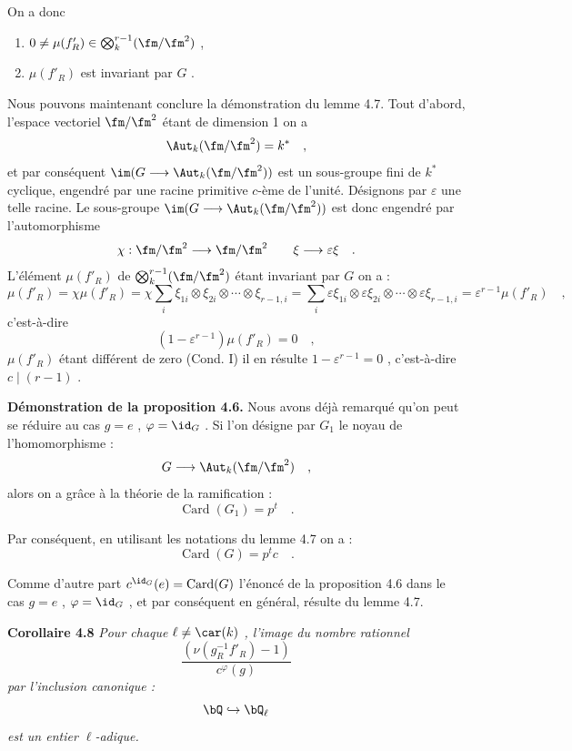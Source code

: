 On a donc
\begin{enumerate}
\item[1)] $0 \neq \mu(f'_R) \in \bigotimes_k^{r-1}(\fm/\fm^2)$ ,
\item[II)] $\mu(f'_R)$ est
invariant par $G$ .
\end{enumerate}

Nous pouvons maintenant conclure la démonstration du lemme 4.7. Tout d'abord, l'espace vectoriel $\fm/\fm^2$ étant de dimension 1 on a
\[
\Aut_k(\fm/\fm^2) = k^* \quad ,
\]
et par conséquent $\im(G \longrightarrow \Aut_k(\fm/\fm^2))$ est un sous-groupe fini de $k^*$ cyclique, engendré par une racine primitive $c$-ème de l'unité. Désignons par $\varepsilon$ une telle racine. Le sous-groupe $\im(G \longrightarrow \Aut_k(\fm/\fm^2))$ est donc engendré par l'automorphisme
\[
\chi : \fm/\fm^2 \longrightarrow \fm/\fm^2 \quad \quad \xi \longrightarrow \varepsilon\xi \quad .
\]
L'élément $\mu(f'_R)$ de $\bigotimes_k^{r-1}(\fm/\fm^2)$ étant invariant par $G$ on a :
\[
\mu(f'_R) = \chi\mu(f'_R) = \chi\sum_i \xi_{1i} \otimes \xi_{2i} \otimes \cdots \otimes \xi_{r-1,i} = \sum_i \varepsilon\xi_{1i} \otimes \varepsilon\xi_{2i} \otimes \cdots \otimes \varepsilon\xi_{r-1,i} = \varepsilon^{r-1}\mu(f'_R) \quad ,
\]
c'est-à-dire
\[
(1 - \varepsilon^{r-1})\mu(f'_R) = 0 \quad ,
\]
$\mu(f'_R)$ étant différent de zero (Cond. I) il en résulte $1 - \varepsilon^{r-1} = 0$ , c'est-à-dire $c \mid (r-1)$ .

\medskip

\noindent
\textbf{Démonstration de la proposition 4.6.} Nous avons déjà remarqué qu'on peut se réduire au cas $g = e$ , $\varphi = \id_G$ . Si l'on désigne par $G_1$ le noyau de l'homomorphisme :
\[
G \longrightarrow \Aut_k(\fm/\fm^2) \quad ,
\]
alors on a grâce à la théorie de la ramification :
\[
\operatorname{Card}(G_1) = p^t \quad .
\]

Par conséquent, en utilisant les notations du lemme 4.7 on a :
\[
\operatorname{Card}(G) = p^t c \quad .
\]

Comme d'autre part $c^{\id_G}(e) = \operatorname{Card}(G)$ l'énoncé de la proposition 4.6 dans le cas $g = e$ , $\varphi = \id_G$ , et par conséquent en général, résulte du lemme 4.7.

\medskip
\noindent
\textbf{Corollaire 4.8} \emph{Pour chaque $\ell \neq \car(k)$ , l'image du nombre rationnel
\[
\frac{(\nu(g_R^{-1}f'_R) - 1)}{c^\varphi(g)}
\]
par l'inclusion canonique :
\[
\bQ \hookrightarrow \bQ_\ell
\]
est un entier $\ell$-adique.}

